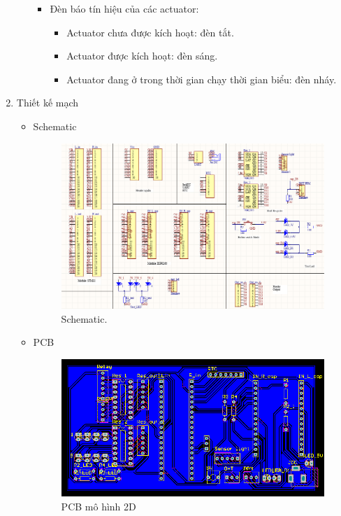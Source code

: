 \documentclass[a4paper,12pt,oneside]{article}
\begin{document}
\begin{enumerate}
\begin{itemize}
\begin{itemize}
\begin{itemize}
		\end{itemize}
		\item Đèn báo tín hiệu của các actuator:
		\begin{itemize}
		\item Actuator chưa được kích hoạt: đèn tắt.
		\item Actuator được kích hoạt: đèn sáng.
		\item Actuator đang ở trong  thời gian chạy thời gian biểu: đèn nháy.
		\end{itemize}
		\end{itemize}
	\end{itemize}
	\item Thiết kế mạch
	\begin{itemize}
		\item Schematic
    	\begin{landscape}
			\begin{figure}[H]
			\centering
			\includegraphics[scale=1]{hinh/schematic.PNG}
			\caption{Schematic.}
			\end{figure}
      \end{landscape}
		\item PCB
			\begin{figure}[H]
			\centering
			\includegraphics[scale=.9]{hinh/PPM/source_2d.PNG}
			\caption{PCB mô hình 2D}
			\end{figure}
			

\end{itemize}
\end{enumerate}
\end{document}
